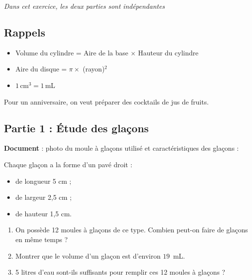 \documentclass[exercice,a4]{thedocument}%
\begin{document}
%
\providecommand{\degres}{^\circ}%
    

\emph{Dans cet exercice, les deux parties sont indépendantes}

\subsection*{Rappels}
\begin{itemize}[label=$\bullet~~$]
\item Volume du cylindre = Aire de la base $\times$ Hauteur du cylindre
\item Aire du disque = $\pi \times$ (rayon)$^2$
\item $1$\,cm$^3 = 1$\,mL
\end{itemize}

Pour un anniversaire, on veut préparer des cocktails de jus de fruits.

\subsection*{Partie 1 : Étude des glaçons}

\textbf{Document} : photo du moule à glaçons utilisé et caractéristiques des glaçons :

\medskip

\begin{minipage}{0.48\linewidth}
\begin{center}

\end{center}
\end{minipage}\hfill
\begin{minipage}{0.48\linewidth}
Chaque glaçon a la forme d'un pavé droit :
\begin{itemize}[label=$\bullet~~$]
\item de longueur 5 cm ;
\item de largeur 2,5 cm ;
\item de hauteur 1,5 cm.
\end{itemize}
\end{minipage}
\begin{enumerate}
\item On possède 12 moules à glaçons de ce type. Combien peut-on faire de glaçons en même temps ?
\item Montrer que le volume d'un glaçon est d'environ $19$~mL.
\item 5 litres d'eau sont-ils suffisants pour remplir ces 12 moules à glaçons ?
\end{enumerate}
\end{document}
